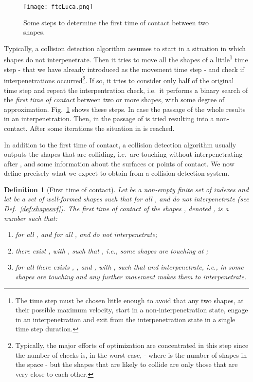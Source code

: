 \documentclass[11pt]{article}
\newtheorem{definition}{Definition}
\begin{document}
\begin{figure}
\begin{center}
\texttt{[image: ftcLuca.png]}
\end{center}
\caption{Some steps to determine the first time of contact between two shapes.}
\label{fig:ftc}
\end{figure}

Typically, a collision detection algorithm assumes to start in a situation in which shapes do not interpenetrate. Then it tries to move all the shapes of a little\footnote{The time step must be chosen little enough to avoid that any two shapes, at their possible maximum velocity, start in a non-interpenetration state, engage in an interpenetration and exit from the interpenetration state in a single time step duration.} time step - that we have already introduced as the movement time step  - and check if interpenetrations occurred\footnote{Typically, the major efforts of optimization are concentrated in this step since the number of checks is, in the worst case,  - where  is the number of shapes in the space - but the shapes that are likely to collide are only those that are very close to each other.}. If so, it tries to consider only half of the original time step and repeat the interpentration check, i.e.\ it performs a binary search of the \emph{first time of contact}  between two or more shapes, with some degree of approximation. Fig.~\ref{fig:ftc} shows these steps. In case  the passage of the whole  results in an interpenetration. Then, in  the passage of  is tried resulting into a non-contact. After some iterations the situation in  is reached.

In addition to the first time of contact, a collision detection algorithm usually outputs the shapes that are colliding, i.e.\ are touching without interpenetrating after , and some information about the surfaces or points of contact. We now define precisely what we expect to obtain from a collision detection system.

\begin{definition}[First time of contact]
\label{def:ftoc}
Let  be a non-empty finite set of indexes and let  be a set of well-formed
shapes such that for all ,  and  do not interpenetrate (see Def.~\ref{def:shapeswf}).
The \emph{first time of contact} of the shapes , denoted , is a
number  such that:
\begin{enumerate}
\item for all ,  and for all ,  and
 do not interpenetrate;

\item there exist , with , such that , i.e., some shapes are touching at ;

\item for all  there exists , , and , with , such that  and  interpenetrate, i.e., in  some shapes are touching and any further movement makes them to interpenetrate.
\end{enumerate}
\end{definition}
\end{document}
